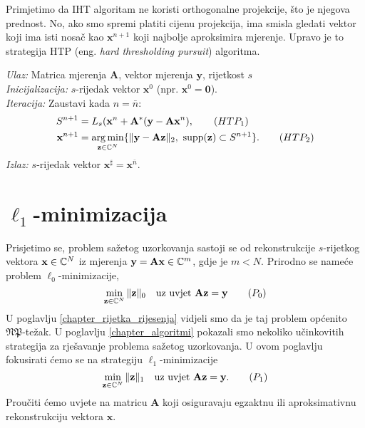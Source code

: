 \documentclass[a4paper,twoside,12pt]{memoir} %
\newcommand{\vect}[1]{\mathbf{#1}}
\renewcommand{\vec}{\vect}
\newcommand{\supp}{\text{\normalfont{supp}}}
\newcommand{\norm}[1]{\|{#1}\|}
\DeclareMathOperator*{\argmin}{arg\,min}
\newenvironment{alg}[1]
{
    \bigskip
    \begin{tcolorbox}[arc=0mm,boxrule=1.2pt,colframe=black,colback=white,detach title, before upper={\medskip\begin{center}\textbf{#1}\end{center}\hline\newline\medskip},frame hidden]
    \medskip
}
{
    \medskip
\end{tcolorbox}
    \bigskip
}
\begin{document}
Primjetimo da IHT algoritam ne koristi orthogonalne projekcije, \v{s}to je njegova prednost. No, ako smo spremi platiti cijenu projekcija, ima smisla gledati vektor koji ima isti nosa\v{c} kao $\vec x^{n+1}$ koji najbolje aproksimira mjerenje. Upravo je to strategija HTP (eng. \textit{hard thresholding pursuit}) algoritma.

\begin{alg}{HTP}
    \textit{Ulaz:} Matrica mjerenja $\vec A$, vektor mjerenja $\vec y$, rijetkost $s$ \\
    \textit{Inicijalizacija:} $s$-rijedak vektor $\vec x^0$ (npr. $\vec x^0 = \vec 0$).\\
    \textit{Iteracija:} Zaustavi kada $n = \bar{n}$:
        \begin{align*}
            S^{n+1} &= L_s(\vec x^n + \vec A^* (\vec y - \vec{Ax}^n),\tag{$HTP_1$}\label{htp_1}\\
            \vec x^{n+1} &= \argmin_{\vec z \in \C^N}\{ \norm{\vec y - \vec{Az}}_2,\ \supp(\vec z) \subset S^{n+1} \}.\tag{$HTP_2$}\label{htp_2}
        \end{align*}
        \textit{Izlaz:} $s$-rijedak vektor $\vec x^{\sharp}=\vec x^{\bar n}$.
\end{alg}





\chapter[$\ell_1$-minimizacija][$\ell_1$-minimizacija]{$\ell_1$-minimizacija}
Prisjetimo se, problem sa\v{z}etog uzorkovanja sastoji se od rekonstrukcije $s$-rijetkog vektora $\vec x \in \C^N$ iz mjerenja $\vec y = \vec{Ax} \in \C^m$, gdje je $m < N$. Prirodno se name\'ce problem $\ell_0$-minimizacije,
\noindent
\begin{equation}
\min_{\vec z \in \C^N} \norm{\vec z}_0\quad \text{uz uvjet }\vec{Az} = \vec{y}\tag{$P_0$}
\end{equation}
U poglavlju \eqref{chapter_rijetka_rijesenja} vidjeli smo da je taj problem op\'cenito $\mathfrak{NP}$-te\v{z}ak. U poglavlju \eqref{chapter_algoritmi} pokazali smo nekoliko u\v{c}inkovitih strategija za rje\v{s}avanje problema sa\v{z}etog uzorkovanja. U ovom poglavlju fokusirati \'cemo se na strategiju $\ell_1$-minimizacije
\begin{equation}
    \min_{\vec z \in \C^N} \norm{\vec z}_1 \quad \text{uz uvjet }\vec{Az}=\vec y.\tag{$P_1$}
\end{equation}
Prou\v{c}iti \'{c}emo uvjete na matricu $\vec A$ koji osiguravaju egzaktnu ili aproksimativnu rekonstrukciju vektora $\vec x$.
\end{document}
